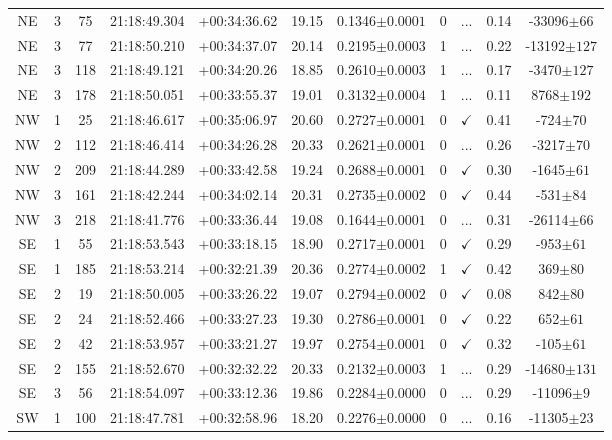 \begin{landscape}
\begin{longtable}{ccccccccccc}
	NE & 3 & 75 & 21:18:49.304 & +00:34:36.62 & 19.15 & 0.1346$\pm{0.0001}$ & 0 & ... & 0.14 & -33096$\pm{66}$ \\
	NE & 3 & 77 & 21:18:50.210 & +00:34:37.07 & 20.14 & 0.2195$\pm{0.0003}$ & 1 & ... & 0.22 & -13192$\pm{127}$ \\
	NE & 3 & 118 & 21:18:49.121 & +00:34:20.26 & 18.85 & 0.2610$\pm{0.0003}$ & 1 & ... & 0.17 & -3470$\pm{127}$ \\
	NE & 3 & 178 & 21:18:50.051 & +00:33:55.37 & 19.01 & 0.3132$\pm{0.0004}$ & 1 & ... & 0.11 & 8768$\pm{192}$ \\
	NW & 1 & 25 & 21:18:46.617 & +00:35:06.97 & 20.60 & 0.2727$\pm{0.0001}$ & 0 & $\checkmark$ & 0.41 & -724$\pm{70}$ \\
	NW & 2 & 112 & 21:18:46.414 & +00:34:26.28 & 20.33 & 0.2621$\pm{0.0001}$ & 0 & ... & 0.26 & -3217$\pm{70}$ \\
	NW & 2 & 209 & 21:18:44.289 & +00:33:42.58 & 19.24 & 0.2688$\pm{0.0001}$ & 0 & $\checkmark$ & 0.30 & -1645$\pm{61}$ \\
	NW & 3 & 161 & 21:18:42.244 & +00:34:02.14 & 20.31 & 0.2735$\pm{0.0002}$ & 0 & $\checkmark$ & 0.44 & -531$\pm{84}$ \\
	NW & 3 & 218 & 21:18:41.776 & +00:33:36.44 & 19.08 & 0.1644$\pm{0.0001}$ & 0 & ... & 0.31 & -26114$\pm{66}$ \\
	SE & 1 & 55 & 21:18:53.543 & +00:33:18.15 & 18.90 & 0.2717$\pm{0.0001}$ & 0 & $\checkmark$ & 0.29 & -953$\pm{61}$ \\
	SE & 1 & 185 & 21:18:53.214 & +00:32:21.39 & 20.36 & 0.2774$\pm{0.0002}$ & 1 & $\checkmark$ & 0.42 & 369$\pm{80}$ \\
	SE & 2 & 19 & 21:18:50.005 & +00:33:26.22 & 19.07 & 0.2794$\pm{0.0002}$ & 0 & $\checkmark$ & 0.08 & 842$\pm{80}$ \\
	SE & 2 & 24 & 21:18:52.466 & +00:33:27.23 & 19.30 & 0.2786$\pm{0.0001}$ & 0 & $\checkmark$ & 0.22 & 652$\pm{61}$ \\
	SE & 2 & 42 & 21:18:53.957 & +00:33:21.27 & 19.97 & 0.2754$\pm{0.0001}$ & 0 & $\checkmark$ & 0.32 & -105$\pm{61}$ \\
	SE & 2 & 155 & 21:18:52.670 & +00:32:32.22 & 20.33 & 0.2132$\pm{0.0003}$ & 1 & ... & 0.29 & -14680$\pm{131}$ \\
	SE & 3 & 56 & 21:18:54.097 & +00:33:12.36 & 19.86 & 0.2284$\pm{0.0000}$ & 0 & ... & 0.29 & -11096$\pm{9}$ \\
	SW & 1 & 100 & 21:18:47.781 & +00:32:58.96 & 18.20 & 0.2276$\pm{0.0000}$ & 0 & ... & 0.16 & -11305$\pm{23}$ \\

\end{longtable}
\end{landscape}
